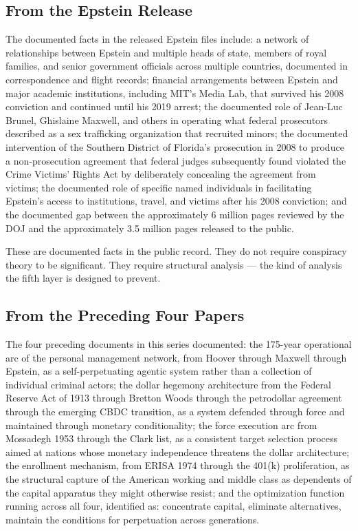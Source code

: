 \documentclass[11pt,a4paper]{article}
\begin{document}
\subsection{From the Epstein Release}

The documented facts in the released Epstein files include: a network of relationships between Epstein and multiple heads of state, members of royal families, and senior government officials across multiple countries, documented in correspondence and flight records; financial arrangements between Epstein and major academic institutions, including MIT's Media Lab, that survived his 2008 conviction and continued until his 2019 arrest; the documented role of Jean-Luc Brunel, Ghislaine Maxwell, and others in operating what federal prosecutors described as a sex trafficking organization that recruited minors; the documented intervention of the Southern District of Florida's prosecution in 2008 to produce a non-prosecution agreement that federal judges subsequently found violated the Crime Victims' Rights Act by deliberately concealing the agreement from victims; the documented role of specific named individuals in facilitating Epstein's access to institutions, travel, and victims after his 2008 conviction; and the documented gap between the approximately 6 million pages reviewed by the DOJ and the approximately 3.5 million pages released to the public.


These are documented facts in the public record. They do not require conspiracy theory to be significant. They require structural analysis — the kind of analysis the fifth layer is designed to prevent.


\subsection{From the Preceding Four Papers}

The four preceding documents in this series documented: the 175-year operational arc of the personal management network, from Hoover through Maxwell through Epstein, as a self-perpetuating agentic system rather than a collection of individual criminal actors; the dollar hegemony architecture from the Federal Reserve Act of 1913 through Bretton Woods through the petrodollar agreement through the emerging CBDC transition, as a system defended through force and maintained through monetary conditionality; the force execution arc from Mossadegh 1953 through the Clark list, as a consistent target selection process aimed at nations whose monetary independence threatens the dollar architecture; the enrollment mechanism, from ERISA 1974 through the 401(k) proliferation, as the structural capture of the American working and middle class as dependents of the capital apparatus they might otherwise resist; and the optimization function running across all four, identified as: concentrate capital, eliminate alternatives, maintain the conditions for perpetuation across generations.
\end{document}
